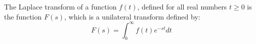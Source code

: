 \documentclass[12pt,a4paper]{article}
\begin{document}
The Laplace transform of a function $f(t)$, defined for all real numbers $t \geq 0$ is the function $F(s)$, which is a unilateral transform defined by:
\begin{equation*}
    F(s) = \int_0^\infty f(t)e^{-st} dt
\end{equation*}
\end{document}
